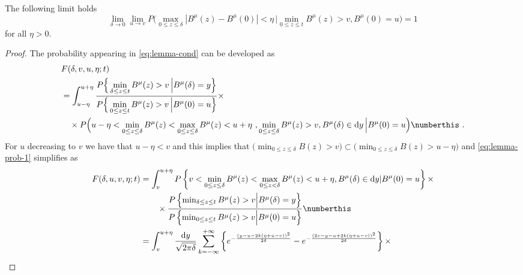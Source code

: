 \begin{corollary} \label{lem:tight-cond-calc}
	The following limit holds 
	\begin{equation}\label{eq:lemma-cond}
	\lim_{\delta \to 0}
	\lim_{u \to v} 
	P \Big( \max_{0\leq z \leq \delta } | B^\mu ( z)  - B^\mu ( 0 ) | < \eta  \, \Big | 
	\min_{ 0\leq z \leq t} B^\mu ( z) > v ,  B^\mu(0) = u \Big) = 1
	\end{equation}
	for all $ \eta >0 $.
\end{corollary}
%
%
\begin{proof}
	The probability appearing in  \eqref{eq:lemma-cond} can be developed as 
	\begin{align*}
	&
	F(\delta, v, u, \eta; t)  \\
	&=
	\int_{u-\eta}^{u + \eta} 
	\frac{\displaystyle 
		P \Big\{   \min_{\delta \leq z \leq t} B^\mu(z)> v  \, \Big \vert B^\mu (\delta) = y 
		\Big \} 
	}{
		\displaystyle
		P \Big \{  \min_{0\leq z \leq t} B^{\mu}(z)> v \,  \Big \vert  B^{\mu}(0) = u  \Big\}
	}  \times 
	\\
	& 
	\quad \times P \Big( u - \eta < \min_{ 0\leq z \leq \delta} B^\mu ( z) < 
	\max_{0\leq z \leq \delta}  B^\mu (z )  < u + \eta \,\, , 
	\min_{ 0\leq z \leq \delta} B^\mu (z) > v ,  
	B^\mu(\delta) \in \mathrm d y \, \Big| B^\mu(0) = u \Big )
	\numberthis \label{eq:lemma-prob-1}
	\,\, .
	\end{align*}
	For $ u $ decreasing to $ v $ we have that $ u - \eta < v $ and this implies that 
	$ \Big( \min_{ 0\leq z \leq \delta} B(z) > v  \Big ) \subset   \Big( \min_{ 0\leq z \leq \delta} B(z) > u - \eta \Big ) $
	and \eqref{eq:lemma-prob-1} simplifies as 
	\begin{align*}
	F(\delta, u, v, \eta;t) &= 
	\int_{v}^{u + \eta} P\left\{ v < \min_{ 0\leq z \leq \delta} B^\mu ( z )  
	< \max_{0 \leq z <\delta } B^\mu(z) < u + \eta,
	B^\mu(\delta ) \in \mathrm d y | B^\mu(0) = u  \right\} \times \\
	& \qquad \times 
	\frac{
		P\left\{ \min_{ \delta \leq z \leq t} B^\mu( z) > v \Big | B^\mu(\delta ) = y \right\}
	}{
		P\left\{ \min_{ 0 \leq z \leq t} B^\mu( z) > v \Big | B^\mu(0 ) = u \right\}
	}
	\numberthis  \label{eq:lemma-prob-simp}
	\\
	&=
	\int_{v}^{u + \eta } \frac{\mathrm d y}{\sqrt{2 \pi \delta }}
	\sum_{k = - \infty}^{+ \infty}
	\left\{
	e^{  -  \frac{ (y - u -2k(\eta + u - v))^2}{2 \delta}  } 
	- 
	e^{  -  \frac{ (2 v - y - u +2k(\eta + u - v))^2}{2 \delta}  }
	\right\}
	\times 
	\\

\end{align*}
\end{proof}
